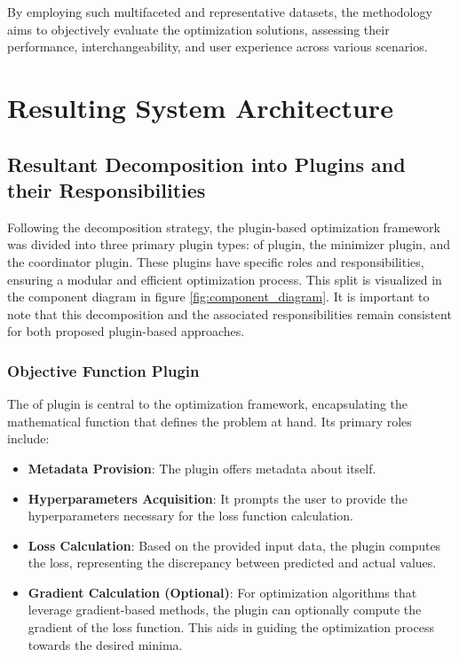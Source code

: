 \documentclass[
  a4paper,  %
  twoside,  %
  bibliography=totoc,
  headsepline,
  cleardoublepage=empty,
  parskip=half,
  draft=false
]{scrbook}
\begin{document}
By employing such multifaceted and representative datasets, the methodology aims to objectively evaluate the optimization solutions, assessing their performance, interchangeability, and user experience across various scenarios.

\chapter{Resulting System Architecture}
\label{chap:architecture}


\section{Resultant Decomposition into Plugins and their Responsibilities}
\label{sec:resdecomposition}

Following the decomposition strategy, the plugin-based optimization framework was divided into three primary plugin types:
\gls{of} plugin, the minimizer plugin, and the coordinator plugin.
These plugins have specific roles and responsibilities, ensuring a modular and efficient optimization process.
This split is visualized in the component diagram in figure \ref{fig:component_diagram}.
It is important to note that this decomposition and the associated responsibilities remain consistent for both proposed plugin-based approaches.

\subsection{Objective Function Plugin}

The \gls{of} plugin is central to the optimization framework, encapsulating the mathematical function that defines the problem at hand.
Its primary roles include:

\begin{itemize}
\item \textbf{Metadata Provision}: The plugin offers metadata about itself.
\item \textbf{Hyperparameters Acquisition}: It prompts the user to provide the hyperparameters necessary for the loss function calculation.
\item \textbf{Loss Calculation}: Based on the provided input data, the plugin computes the loss, representing the discrepancy between predicted and actual values.
\item \textbf{Gradient Calculation (Optional)}: For optimization algorithms that leverage gradient-based methods, the plugin can optionally compute the gradient of the loss function.
This aids in guiding the optimization process towards the desired minima.
\end{itemize}
\end{document}
